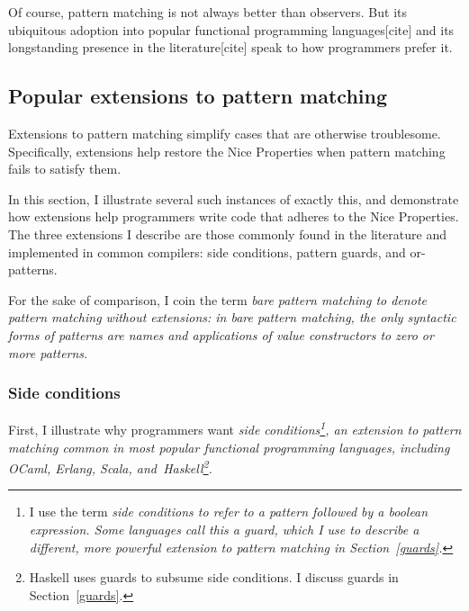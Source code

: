 \documentclass[manuscript,screen,review, 12pt, nonacm]{acmart}
\begin{document}
\begin{outline}[enumerate]
Of course, pattern matching is not always better than observers. But its
ubiquitous adoption into popular functional programming languages[cite] and its
longstanding presence in the literature[cite] speak to how programmers prefer
it. 



\subsection{Popular extensions to pattern matching}
\label{extensions}

    Extensions to pattern matching simplify cases that are otherwise
    troublesome. Specifically, extensions help restore the Nice Properties when
    pattern matching fails to satisfy them. 
    
    In this section, I illustrate several such instances of exactly this, and
    demonstrate how extensions help programmers write code that adheres to the
    Nice Properties. The three extensions I describe are those commonly found in
    the literature and implemented in common compilers: side conditions, pattern
    guards, and or-patterns. 
    
    For the sake of comparison, I coin the term \it{bare pattern matching} to
    denote pattern matching \it{without} extensions: in bare pattern matching,
    the only syntactic forms of patterns are names and applications of value
    constructors to zero or more patterns. 



\subsubsection{Side conditions}

    First, I illustrate why programmers want \it{side conditions}\footnote{I use
    the term \it{side conditions} to refer to a pattern followed by a boolean
    expression. Some languages call this a \it{guard}, which I use to describe a
    different, more powerful extension to pattern matching in
    Section~\ref{guards}.}, an extension to pattern matching common in most
    popular functional programming languages, including OCaml, Erlang, Scala,
    and~Haskell\footnote{Haskell uses guards to subsume side conditions. I
    discuss guards in Section~\ref{guards}.}. 
    

\end{outline}
\end{document}
